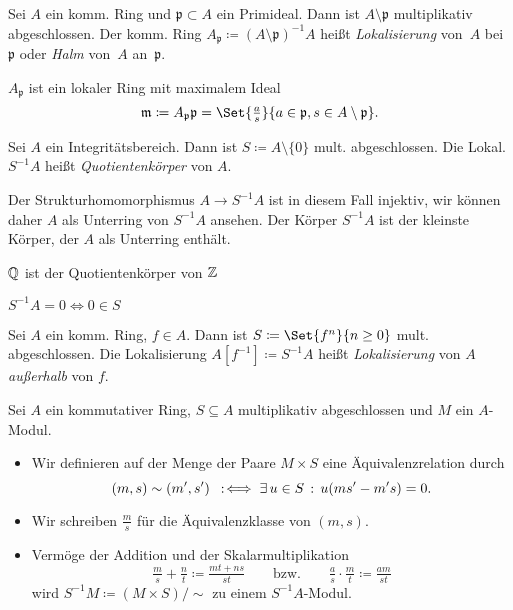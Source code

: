 \documentclass{cheat-sheet}
\newcommand{\ppp}{\mathfrak{p}}
\newcommand{\mmm}{\mathfrak{m}}
\begin{document}
\begin{defn}
  Sei $A$ ein komm. Ring und $\ppp \subset A$ ein Primideal.
  Dann ist $A \setminus \ppp$ multiplikativ abgeschlossen.
  Der komm. Ring $A_\ppp \coloneqq (A \setminus \ppp)^{-1} A$ heißt \emph{Lokalisierung} von~$A$ bei~$\ppp$ oder \emph{Halm} von~$A$ an~$\ppp$.
\end{defn}

\begin{bem}
  $A_\ppp$ ist ein lokaler Ring mit maximalem Ideal
  \[
    \mmm \coloneqq A_\ppp \ppp = \Set{\tfrac{a}{s}}{a \in \ppp, s \in A \setminus \ppp}.
  \]
\end{bem}

\begin{defn}
  Sei $A$ ein Integritätsbereich.
  Dann ist $S \coloneqq A \setminus \{ 0 \}$ mult. abgeschlossen.
  Die Lokal. $S^{-1} A$ heißt \emph{Quotientenkörper} von $A$.
\end{defn}

\begin{bem}
  Der Strukturhomomorphismus $A \to S^{-1} A$ ist in diesem Fall injektiv, wir können daher $A$ als Unterring von $S^{-1} A$ ansehen.
  Der Körper $S^{-1} A$ ist der kleinste Körper, der $A$ als Unterring enthält.
\end{bem}

\begin{bsp}
  $\mathbb{Q}$ ist der Quotientenkörper von $\mathbb{Z}$
\end{bsp}

\begin{bsp}
  $S^{-1} A = 0 \iff 0 \in S$
\end{bsp}

\begin{defn}
  Sei $A$ ein komm. Ring, $f \in A$.
  Dann ist $S \coloneqq \Set{f^n}{n \geq 0}$ mult. abgeschlossen.
  Die Lokalisierung $A[f^{-1}] \coloneqq S^{-1} A$ heißt \emph{Lokalisierung} von $A$ \textit{außerhalb} von $f$.
\end{defn}


\begin{konstr}
  Sei $A$ ein kommutativer Ring, $S \subseteq A$ multiplikativ abgeschlossen und $M$ ein $A$-Modul.
  \begin{itemize}
    \item Wir definieren auf der Menge der Paare $M \times S$ eine Äquivalenzrelation durch
    \[
      (m, s) \sim (m', s') \enspace:\!\iff \exists \, {u \in S} \,:\, u (m s' - m' s) = 0.
    \]
    \item Wir schreiben $\tfrac{m}{s}$ für die Äquivalenzklasse von $(m, s)$.
    \item Vermöge der Addition und der Skalarmultiplikation
    \[
      \tfrac{m}{s} + \tfrac{n}{t} \coloneqq \tfrac{m t + n s}{s t}
      \qquad \text{bzw.} \qquad
      \tfrac{a}{s} \cdot \tfrac{m}{t} \coloneqq \tfrac{a m}{s t}
    \]
    wird $S^{-1} M \coloneqq (M \times S)/{\sim}$ zu einem $S^{-1} A$-Modul.
  \end{itemize}
\end{konstr}
\end{document}
